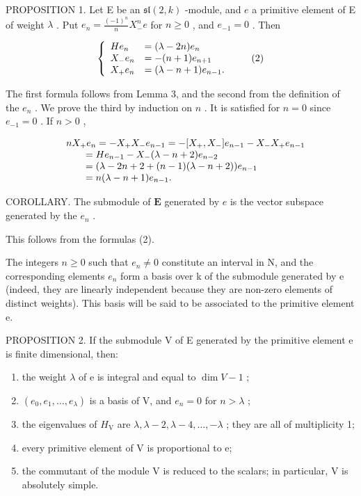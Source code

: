 PROPOSITION 1. Let E be an \(\mathfrak{sl}(2,k)\) -module, and \(e\) a primitive element of E of weight \(\lambda\) . Put \(e_n = \frac{(-1)^n}{n} X_-^n e\) for \(n \geq 0\) , and \(e_{-1} = 0\) . Then

\[
\left\{ \begin{array}{l l} H e _ {n} & = (\lambda - 2 n) e _ {n} \\ X _ {-} e _ {n} & = - (n + 1) e _ {n + 1} \\ X _ {+} e _ {n} & = (\lambda - n + 1) e _ {n - 1}. \end{array} \right.\tag{2}
\]

The first formula follows from Lemma 3, and the second from the definition of the \(e_n\) . We prove the third by induction on \(n\) . It is satisfied for \(n = 0\) since \(e_{-1} = 0\) . If \(n > 0\) ,

\[
\begin{array}{r l} & n X _ {+} e _ {n} = - X _ {+} X _ {-} e _ {n - 1} = - [ X _ {+}, X _ {-} ] e _ {n - 1} - X _ {-} X _ {+} e _ {n - 1} \\ & \qquad = H e _ {n - 1} - X _ {-} (\lambda - n + 2) e _ {n - 2} \\ & \qquad = (\lambda - 2 n + 2 + (n - 1) (\lambda - n + 2)) e _ {n - 1} \\ & \qquad = n (\lambda - n + 1) e _ {n - 1}. \end{array}
\]

COROLLARY. The submodule of \(\mathbf{E}\) generated by \(e\) is the vector subspace generated by the \(e_n\) .

This follows from the formulas (2).

The integers \(n \geq 0\) such that \(e_{n} \neq 0\) constitute an interval in N, and the corresponding elements \(e_{n}\) form a basis over k of the submodule generated by e (indeed, they are linearly independent because they are non-zero elements of distinct weights). This basis will be said to be associated to the primitive element e.

PROPOSITION 2. If the submodule V of E generated by the primitive element e is finite dimensional, then:

\begin{enumerate}
\def\labelenumi{(\roman{enumi})}
\item
  the weight \(\lambda\) of e is integral and equal to \(\dim V - 1\) ;
\item
  \((e_0, e_1, \ldots, e_\lambda)\) is a basis of V, and \(e_n = 0\) for \(n > \lambda\) ;
\item
  the eigenvalues of \(H_{\mathrm{V}}\) are \(\lambda, \lambda - 2, \lambda - 4, \ldots, -\lambda\) ; they are all of multiplicity 1;
\item
  every primitive element of V is proportional to e;
\item
  the commutant of the module \(\mathrm{V}\) is reduced to the scalars; in particular, \(\mathrm{V}\) is absolutely simple.
\end{enumerate}


